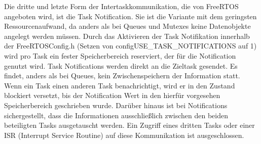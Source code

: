 Die dritte und letzte Form der Intertaskkommunikation, die von FreeRTOS angeboten wird, ist die Task Notification. Sie ist die Variante mit dem geringsten Ressourcenaufwand, da anders als bei Queues und Mutexes keine Datenobjekte angelegt werden müssen. Durch das Aktivieren der Task Notifikation innerhalb der FreeRTOSConfig.h (Setzen von configUSE\_TASK\_NOTIFICATIONS auf 1) wird pro Task ein fester Speicherbereich reserviert, der für die Notification genutzt wird. Task Notifications werden direkt an die Zieltask gesendet. Es findet, anders als bei Queues, kein Zwischenspeichern der Information statt. Wenn ein Task einen anderen Task benachrichtigt, wird er in den Zustand blockiert versetzt, bis der Notification Wert in den hierfür vorgesehen Speicherbereich geschrieben wurde. Darüber hinaus ist bei Notifications sichergestellt, dass die Informationen ausschließlich zwischen den beiden beteiligten Tasks ausgetauscht werden. Ein Zugriff eines dritten Tasks oder einer ISR (Interrupt Service Routine) auf diese Kommunikation ist ausgeschlossen.
